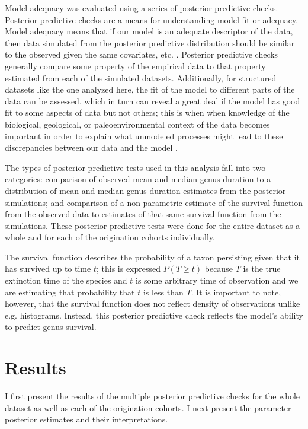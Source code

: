 \documentclass[11pt]{article}
\begin{document}
Model adequacy was evaluated using a series of posterior predictive checks. Posterior predictive checks are a means for understanding model fit or adequacy. Model adequacy means that if our model is an adequate descriptor of the data, then data simulated from the posterior predictive distribution should be similar to the observed given the same covariates, etc. \citep{Gelman2013d}. Posterior predictive checks generally compare some property of the empirical data to that property estimated from each of the simulated datasets. Additionally, for structured datasets like the one analyzed here, the fit of the model to different parts of the data can be assessed, which in turn can reveal a great deal if the model has good fit to some aspects of data but not others; this is when when knowledge of the biological, geological, or paleoenvironmental context of the data becomes important in order to explain what unmodeled processes might lead to these discrepancies between our data and the model \citep{Gelman2013d}.

The types of posterior predictive tests used in this analysis fall into two categories: comparison of observed mean and median genus duration to a distribution of mean and median genus duration estimates from the posterior simulations; and comparison of a non-parametric estimate of the survival function from the observed data to estimates of that same survival function from the simulations. These posterior predictive tests were done for the entire dataset as a whole and for each of the origination cohorts individually.

The survival function describes the probability of a taxon persisting given that it has survived up to time \(t\); this is expressed \(P(T \geq t)\) because \(T\) is the true extinction time of the species and \(t\) is some arbitrary time of observation and we are estimating that probability that \(t\) is less than \(T\). It is important to note, however, that the survival function does not reflect density of observations unlike e.g. histograms. Instead, this posterior predictive check reflects the model's ability to predict genus survival.








\section*{Results}
I first present the results of the multiple posterior predictive checks for the whole dataset as well as each of the origination cohorts. I next present the parameter posterior estimates and their interpretations. 
\end{document}
